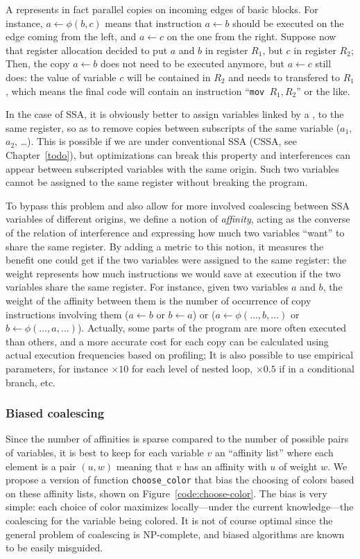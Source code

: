 {A \phifun represents in fact parallel copies on incoming edges of basic blocks. 
For instance, $a \gets \phi(b,c)$ means that instruction $a\gets b$ should be executed on the edge coming from the left, and $a\gets c$ on the one from the right. 
Suppose now that register allocation decided to put $a$ and $b$ in register $R_1$, but $c$ in register $R_2$;
Then, the copy $a\gets b$ does not need to be executed anymore, but $a\gets c$ still does:
the value of variable $c$ will be contained in $R_2$ and needs to transfered to $R_1$, which means the final code will contain an instruction ``{\tt mov $R_1, R_2$}'' or the like. 


In the case of SSA, it is obviously better to assign variables linked by a \phifun, to the same register, so as to remove copies between subscripts of the same variable ($a_1$, $a_2$, \dots).
This is possible if we are under conventional SSA (CSSA, see Chapter~\ref{todo}), but optimizations can break this property and interferences can appear between subscripted variables with the same origin.
Such two variables cannot be assigned to the same register without breaking the program.

To bypass this problem and also allow for more involved coalescing between SSA variables of different origins,
we define a notion of \emph{affinity}, acting as the converse of the relation of interference and expressing how much two variables ``want'' to share the same register. 
By adding a metric to this notion, it measures the benefit one could get if the two variables were assigned to the same register:
the weight represents how much instructions we would save at execution if the two variables share the same register.
For instance, given two variables $a$ and $b$, the weight of the affinity between them is the number of occurrence of copy instructions involving them ($a\gets b$ or $b\gets a$) or \phifuns ($a\gets\phi(\ldots,b,\ldots)$ or $b\gets\phi(\ldots,a,\ldots)$).
Actually, some parts of the program are more often executed than others, and a more accurate cost for each copy can be calculated using actual execution frequencies based on profiling;
It is also possible to use empirical parameters, for instance $\times 10$ for each level of nested loop, $\times 0.5$ if in a conditional branch, etc.


\subsubsection{Biased coalescing}

Since the number of affinities is sparse compared to the number of possible pairs of variables,
it is best to keep for each variable $v$ an ``affinity list'' where each element is a pair $(u,w)$ meaning that $v$ has an affinity with $u$ of weight $w$.
We propose a version of function {\tt choose\_color} that bias the choosing of colors based on these affinity lists, shown on Figure~\ref{code:choose-color}. 
The bias is very simple: each choice of color maximizes locally---under the current knowledge---the coalescing for the variable being colored. 
It is not of course optimal since the general problem of coalescing is NP-complete, and biased algorithms are known to be easily misguided. 


}
